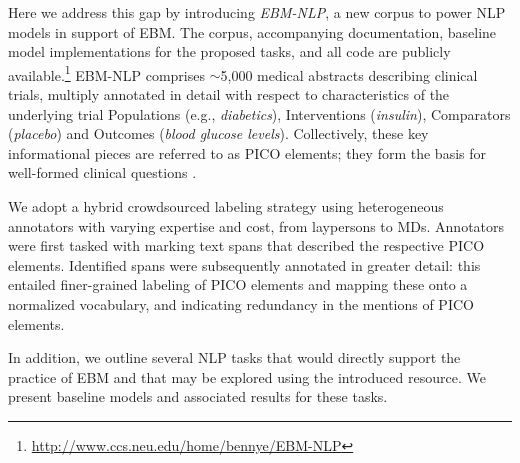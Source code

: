 \documentclass[11pt,a4paper]{article}
\begin{document}
Here we address this gap by introducing \emph{EBM-NLP}, a new corpus to power NLP models in support of EBM. The corpus, accompanying documentation, baseline model implementations for the proposed tasks, and all code are publicly available.\footnote{\url{http://www.ccs.neu.edu/home/bennye/EBM-NLP}} EBM-NLP comprises $\sim$5,000 medical abstracts describing clinical trials, multiply annotated in detail with respect to characteristics of the underlying trial Populations (e.g., \emph{diabetics}), Interventions (\emph{insulin}), Comparators (\emph{placebo}) and Outcomes (\emph{blood glucose levels}). Collectively, these key informational pieces are referred to as PICO elements; they form the basis for well-formed clinical questions \cite{huang2006evaluation}. %

We adopt a hybrid crowdsourced labeling strategy using heterogeneous annotators with varying expertise and cost, from laypersons to MDs. Annotators were first tasked with marking text spans that described the respective PICO elements. Identified spans were subsequently annotated in greater detail: this entailed finer-grained labeling of PICO elements and mapping these onto a normalized vocabulary, and indicating redundancy in the mentions of PICO elements. 

In addition, we outline several NLP tasks that would directly support the practice of EBM and that may be explored using the introduced resource. We present baseline models and associated results for these tasks. 

\end{document}
